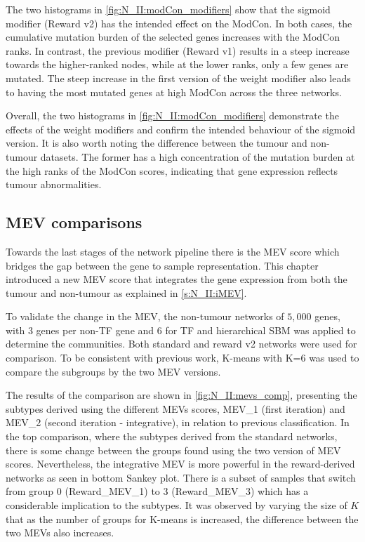 The two histograms in \cref{fig:N_II:modCon_modifiers} show that the sigmoid modifier (Reward v2) has the intended effect on the ModCon. In both cases, the cumulative mutation burden of the selected genes increases with the ModCon ranks. In contrast, the previous modifier (Reward v1) results in a steep increase towards the higher-ranked nodes, while at the lower ranks, only a few genes are mutated. The steep increase in the first version of the weight modifier also leads to having the most mutated genes at high ModCon across the three networks.

Overall, the two histograms in \cref{fig:N_II:modCon_modifiers} demonstrate the effects of the weight modifiers and confirm the intended behaviour of the sigmoid version. It is also worth noting the difference between the tumour and non-tumour datasets. The former has a high concentration of the mutation burden at the high ranks of the ModCon scores, indicating that gene expression reflects tumour abnormalities.


\subsection{MEV comparisons} \label{s:N_II:mev_comp}

Towards the last stages of the network pipeline there is the MEV score which bridges the gap between the gene to sample representation. This chapter introduced a new MEV score that integrates the gene expression from both the tumour and non-tumour as explained in \cref{s:N_II:iMEV}.

To validate the change in the MEV, the non-tumour networks of $5,000$ genes, with $3$ genes per non-TF gene and $6$ for TF and hierarchical SBM was applied to determine the communities. Both standard and reward v2 networks were used for comparison. To be consistent with previous work, K-means with K=6 was used to compare the subgroups by the two MEV versions.

The results of the comparison are shown in \cref{fig:N_II:mevs_comp}, presenting the subtypes derived using the different MEVs scores, MEV\_1 (first iteration) and MEV\_2 (second iteration - integrative), in relation to previous classification. In the top comparison, where the subtypes derived from the standard networks, there is some change between the groups found using the two version of MEV scores. Nevertheless, the integrative MEV is more powerful in the reward-derived networks as seen in bottom Sankey plot. There is a subset of samples that switch from group 0 (Reward\_MEV\_1) to 3 (Reward\_MEV\_3) which has a considerable implication to the subtypes. It was observed by varying the size of $K$ that as the number of groups for K-means is increased, the difference between the two MEVs also increases. 


